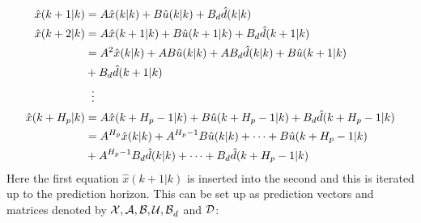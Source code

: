 \begin{equation}\label{eq:iterating_state_equation}
\begin{aligned}
	\hat{x}(k+1|k) &= A\hat{x}(k|k)+B\hat{u}(k|k) + B_d\hat{d}(k|k)\\
	\hat{x}(k+2|k) &= A\hat{x}(k+1|k)+B\hat{u}(k+1|k)+ B_d\hat{d}(k+1|k) \\
				   &= A^2\hat{x}(k|k)+AB\hat{u}(k|k)+AB_d\hat{d}(k|k) + B\hat{u}(k+1|k) \\
				   &+ B_d\hat{d}(k+1|k) \\
				   &\hspace{2mm}\vdots\\
   \hat{x}(k+H_p|k)&= A\hat{x}(k+H_p-1|k)+B\hat{u}(k+H_p-1|k)+B_d\hat{d}(k+H_p-1|k)\\
   				   &= A^{H_p}\hat{x}(k|k)+A^{H_p-1}B\hat{u}(k|k)+\cdots+ B\hat{u}(k+H_p-1|k)\\
   				   &+A^{H_p-1}B_d\hat{d}(k|k)+\cdots+B_d\hat{d}(k+H_p-1|k)
\end{aligned}
\end{equation}
Here the first equation $\hat{x}(k+1|k)$ is inserted into the second and this is iterated up to the prediction horizon. This can be set up as prediction vectors and matrices denoted by $\CMcal{X,A,B,U,B}_d$ and $\CMcal{D}$:




